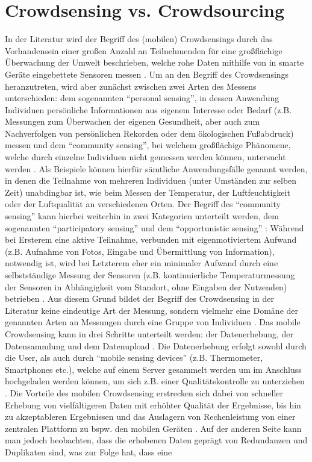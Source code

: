\section{Crowdsensing vs. Crowdsourcing}
In der Literatur wird der Begriff des (mobilen) Crowdsensings durch das Vorhandensein einer großen Anzahl an Teilnehmenden für eine großflächige Überwachung der Umwelt beschrieben, welche rohe Daten mithilfe von in smarte Geräte eingebettete Sensoren messen \cite{Ray2022}. Um an den Begriff des Crowdsensings heranzutreten, wird aber zunächst zwischen zwei Arten des Messens unterschieden: dem sogenannten \enquote{personal sensing}, in dessen Anwendung Individuen persönliche Informationen aus eigenem Interesse oder Bedarf (z.B. Messungen zum Überwachen der eigenen Gesundheit, aber auch zum Nachverfolgen von persönlichen Rekorden oder dem ökologischen Fußabdruck) messen und dem \enquote{community sensing}, bei welchem großflächige Phänomene, welche durch einzelne Individuen nicht gemessen werden können, untersucht werden \cite{Ganti2011}. \newline Als Beispiele können hierfür sämtliche Anwendungsfälle genannt werden, in denen die Teilnahme von mehreren Individuen (unter Umständen zur selben Zeit) unabdingbar ist, wie beim Messen der Temperatur, der Luftfeuchtigkeit oder der Luftqualität an verschiedenen Orten. Der Begriff des \enquote{community sensing} kann hierbei weiterhin in zwei Kategorien unterteilt werden, dem sogenannten \enquote{participatory sensing} \cite{Burke2006} und dem \enquote{opportunistic sensing} \cite{Lane2010}: \newline Während bei Ersterem eine aktive Teilnahme, verbunden mit eigenmotiviertem Aufwand (z.B. Aufnahme von Fotos, Eingabe und Übermittlung von Information), notwendig ist, wird bei Letzterem eher ein minimaler Aufwand durch eine selbstständige Messung der Sensoren (z.B. kontinuierliche Temperaturmessung der Sensoren in Abhängigkeit vom Standort, ohne Eingaben der Nutzenden) betrieben \cite{Ganti2011}. Aus diesem Grund bildet der Begriff des Crowdsensing in der Literatur keine eindeutige Art der Messung, sondern vielmehr eine Domäne der genannten Arten an Messungen durch eine Gruppe von Individuen \cite{Ganti2011}. \newline Das mobile Crowdsensing kann in drei Schritte unterteilt werden: der Datenerhebung, der Datensammlung und dem Datenupload \cite{Ray2022}. Die Datenerhebung erfolgt sowohl durch die User, als auch durch \enquote{mobile sensing devices} (z.B. Thermometer, Smartphones etc.), welche auf einem Server gesammelt werden um im Anschluss hochgeladen werden können, um sich z.B. einer Qualitätskontrolle zu unterziehen \cite{Ray2022}. Die Vorteile des mobilen Crowdsensing erstrecken sich dabei von schneller Erhebung von vielfältigeren Daten mit erhöhter Qualität der Ergebnisse, bis hin zu akzeptableren Ergebnissen und das Auslagern von Rechenleistung von einer zentralen Plattform zu bspw. den mobilen Geräten \cite{Ray2022}. Auf der anderen Seite kann man jedoch beobachten, dass die erhobenen Daten geprägt von Redundanzen und Duplikaten sind, was zur Folge hat, dass eine 
